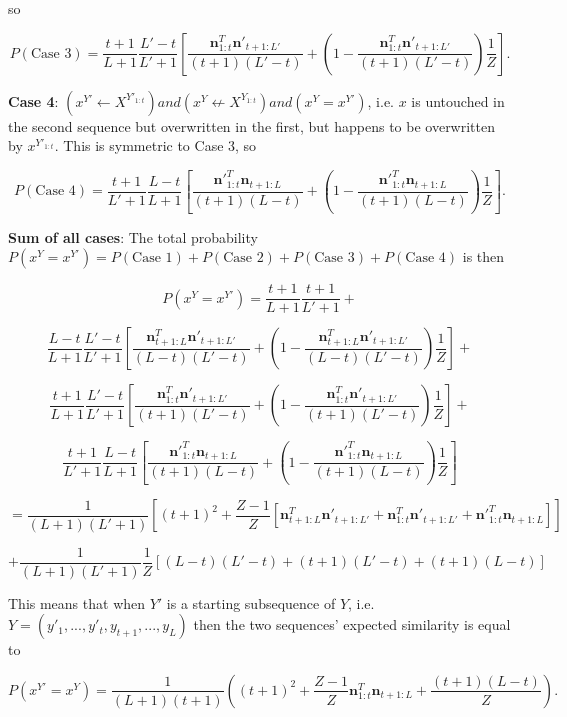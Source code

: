 \documentclass{article}
\begin{document}
so 

$$P(\textrm{Case 3}) = \frac{t+1}{L+1}\frac{L'-t}{L'+1}\left[\frac{\mathbf{n}^T_{1:t}\mathbf{n}'_{t+1:L'}}{(t+1)(L'-t)} + \left(1 - \frac{\mathbf{n}^T_{1:t}\mathbf{n}'_{t+1:L'}}{(t+1)(L'-t)}\right)\frac{1}{Z}\right].$$

\textbf{Case 4}: $(x^{Y'} \leftarrow X^{Y'_{1:t}}) and (x^Y \not\leftarrow X^{Y_{1:t}}) and (x^Y = x^{Y'})$, i.e. $x$ is untouched in the second sequence but overwritten in the first, but happens to be overwritten by $x^{Y'_{1:t}}$. This is symmetric to Case 3, so 

$$P(\textrm{Case 4}) = \frac{t+1}{L'+1}\frac{L-t}{L+1}\left[\frac{\mathbf{n}'^T_{1:t}\mathbf{n}_{t+1:L}}{(t+1)(L-t)} + \left(1 - \frac{\mathbf{n}'^T_{1:t}\mathbf{n}_{t+1:L}}{(t+1)(L-t)}\right)\frac{1}{Z}\right].$$

\textbf{Sum of all cases}: The total probability $P(x^Y = x^{Y'}) = P(\textrm{Case 1}) + P(\textrm{Case 2}) + P(\textrm{Case 3}) + P(\textrm{Case 4})$ is then

$$P(x^Y = x^{Y'}) = \frac{t+1}{L+1}\frac{t+1}{L'+1} + $$

$$\frac{L-t}{L+1}\frac{L'-t}{L'+1}\left[\frac{\mathbf{n}^T_{t+1:L}\mathbf{n}'_{t+1:L'}}{(L-t)(L'-t)} + \left(1 - \frac{\mathbf{n}^T_{t+1:L}\mathbf{n}'_{t+1:L'}}{(L-t)(L'-t)} \right)\frac{1}{Z}\right] + $$

$$\frac{t+1}{L+1}\frac{L'-t}{L'+1}\left[\frac{\mathbf{n}^T_{1:t}\mathbf{n}'_{t+1:L'}}{(t+1)(L'-t)} + \left(1 - \frac{\mathbf{n}^T_{1:t}\mathbf{n}'_{t+1:L'}}{(t+1)(L'-t)}\right)\frac{1}{Z}\right] + $$

$$\frac{t+1}{L'+1}\frac{L-t}{L+1}\left[\frac{\mathbf{n}'^T_{1:t}\mathbf{n}_{t+1:L}}{(t+1)(L-t)} + \left(1 - \frac{\mathbf{n}'^T_{1:t}\mathbf{n}_{t+1:L}}{(t+1)(L-t)}\right)\frac{1}{Z}\right]$$


$$
=\frac{1}{(L+1)(L'+1)}\left[(t+1)^2 + \frac{Z-1}{Z}\left[\mathbf{n}^T_{t+1:L}\mathbf{n}'_{t+1:L'} + \mathbf{n}^T_{1:t}\mathbf{n}'_{t+1:L'} + \mathbf{n}'^T_{1:t}\mathbf{n}_{t+1:L}\right]\right]
$$

$$
+ \frac{1}{(L+1)(L'+1)}\frac{1}{Z}\left[(L-t)(L'-t) + (t+1)(L'-t) + (t+1)(L-t)\right]
$$

This means that when $Y'$ is a starting subsequence of $Y$, i.e. $Y = (y'_1, ..., y'_t, y_{t+1}, ..., y_L)$ then the two sequences' expected similarity is equal to

$$P(x^{Y'} = x^Y) = \frac{1}{(L+1)(t+1)}\left((t+1)^2 + \frac{Z-1}{Z}\mathbf{n}^T_{1:t}\mathbf{n}_{t+1:L} + \frac{(t+1)(L-t)}{Z}\right).$$
\end{document}
